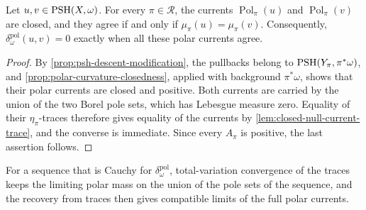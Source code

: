 \begin{corollary}\label{cor:closed-pole-trace-recovery}
Let $u,v\in\mathrm{PSH}(X,\omega)$. For every $\pi\in\mathscr R$, the currents $\operatorname{Pol}_\pi(u)$ and $\operatorname{Pol}_\pi(v)$ are closed, and they agree if and only if $\mu_\pi(u)=\mu_\pi(v)$. Consequently, $\delta_\omega^{\mathrm{pol}}(u,v)=0$ exactly when all these polar currents agree.
\end{corollary}
\begin{proof}
By \cref{prop:psh-descent-modification}, the pullbacks belong to $\mathrm{PSH}(Y_\pi,\pi^*\omega)$, and \cref{prop:polar-curvature-closedness}, applied with background $\pi^*\omega$, shows that their polar currents are closed and positive. Both currents are carried by the union of the two Borel pole sets, which has Lebesgue measure zero. Equality of their $\eta_\pi$-traces therefore gives equality of the currents by \cref{lem:closed-null-current-trace}, and the converse is immediate. Since every $A_\pi$ is positive, the last assertion follows.
\end{proof}

For a sequence that is Cauchy for $\delta^{\mathrm{pol}}_\omega$, total-variation convergence of the traces keeps the limiting polar mass on the union of the pole sets of the sequence, and the recovery from traces then gives compatible limits of the full polar currents.

